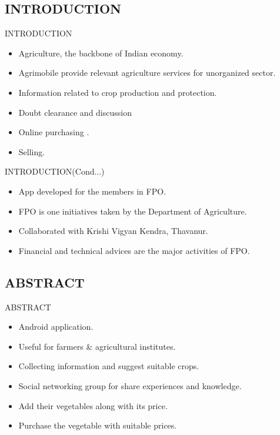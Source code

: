 \subsection{INTRODUCTION}
\begin{frame}{INTRODUCTION}
   \begin{itemize}
    
   	\item Agriculture, the backbone of Indian economy.
   	\item Agrimobile provide relevant agriculture services for unorganized sector.
   	\item Information related to crop production and protection.
   	\item Doubt clearance and discussion 
   	\item Online purchasing .
   	\item Selling.
   	\end{itemize}
   	\end{frame} 
   	 
\begin{frame}{INTRODUCTION(Cond...)}
	\begin{itemize}
   	\item App developed for the members in FPO.
   	\item  FPO is one initiatives taken by the Department of Agriculture.
   	\item Collaborated with Krishi Vigyan Kendra, Thavanur.
   	\item Financial and technical advices are the major activities of FPO.
   \end{itemize}
 \end{frame}  

\subsection{ABSTRACT}
\begin{frame}{ABSTRACT}
   \begin{itemize}
  \item Android application.
  \item Useful for farmers & agricultural institutes.
  \item Collecting information and suggest suitable crops.
  \item Social networking group for share experiences and knowledge.
  \item Add their vegetables along with its price.  
  \item Purchase the vegetable with suitable prices.
  \end{itemize}
  \end{frame}
  

